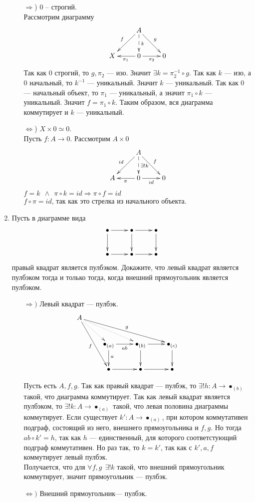 \documentclass[draft]{article}
\begin{document}
\begin{enumerate}
\begin{itemize}
\item[$\Rightarrow$)] 0 -- строгий.\\
Рассмотрим диаграмму 
\[ \xymatrix{ 
& A \ar[dl]_f \ar[dr]^g \ar@{-->}[d]^k &\\
X & 0 \ar[l]^{\pi_1}\ar[r]_{\pi_2} & 0
} \]
Так как 0 строгий, то $g, \pi_2$ --- изо. Значит $\exists k = \pi_2^{-1} \circ g$. Так как $k$ --- изо, а 0 начальный, то $k^{-1}$ --- уникальный. Значит $k$ --- уникальный. Так как 0 --- начальный объект, то $\pi_1$ --- уникальный, а значит $\pi_1 \circ k$ --- уникальный. Значит $f = \pi_1 \circ k$. Таким образом, вся диаграмма коммутирует и $k$ --- уникальный.
\item[$\Leftrightarrow$)] $X\times 0 \simeq 0$.\\
Пусть $f : A \to 0$. Рассмотрим $A \times 0$
\[ \xymatrix{ 
& A \ar[dl]_{id} \ar[dr]^f \ar@{-->}[d]^{\exists!k} &\\
A & 0 \ar[l]^{\pi}\ar[r]_{id} & 0
} \]
$f = k ~~\land~~ \pi\circ k = id \Rightarrow \pi\circ f = id$\\
$f \circ \pi = id$, так как это стрелка из начального объекта.
\end{itemize}


\item Пусть в диаграмме вида
\[ \xymatrix{ \bullet \ar[r] \ar[d] & \bullet \ar[r] \ar[d] & \bullet \ar[d] \\
              \bullet \ar[r]        & \bullet \ar[r]        & \bullet
            } \]
правый квадрат является пулбэком.
Докажите, что левый квадрат является пулбэком тогда и только тогда, когда внешний прямоугольник является пулбэком.

\begin{itemize}
\item[$\Rightarrow)$] Левый квадрат --- пулбэк.\\

\[ \xymatrix{ 
A \ar@{..>}[dr] \ar[ddr]_f \ar[rrrd]^g \ar@{..>}[rrd] & & & &\\
& \bullet_{(a)} \ar[r]_{ab} \ar[d]^a & \bullet_{(b)} \ar[r] \ar[d] & \bullet_{(c)} \ar[d]\\
& \bullet \ar[r]        & \bullet \ar[r]        & \bullet
} \]

Пусть есть $A, f, g$. Так как правый квадрат --- пулбэк, то $\exists! h : A \to \bullet_{(b)}$ такой, что диаграмма коммутирует. Так как левый квадрат является пулбэком, то $\exists! k : A \to \bullet_{(a)}$ такой, что левая половина диаграммы коммутирует. Если существует $k' : A \to \bullet_{(a)}$, при котором коммутативен подграф, состоящий из него, внешнего прямоугольника и $f, g$. Но тогда $ab \circ k' = h$, так как $h$ --- единственный, для которого соответстующий подграф коммутативен. Но раз так, то $k = k'$, так как с $k', a, f$ коммутирует левый пулбэк.\\
Получается, что для  $\forall f, g ~~\exists!k$ такой, что внешний прямоугольник коммутирует, значит прямоугольник --- пулбэк.
\item[$\Leftrightarrow)$] Внешний прямоугольник--- пулбэк.\\


\end{itemize}
\end{enumerate}
\end{document}
